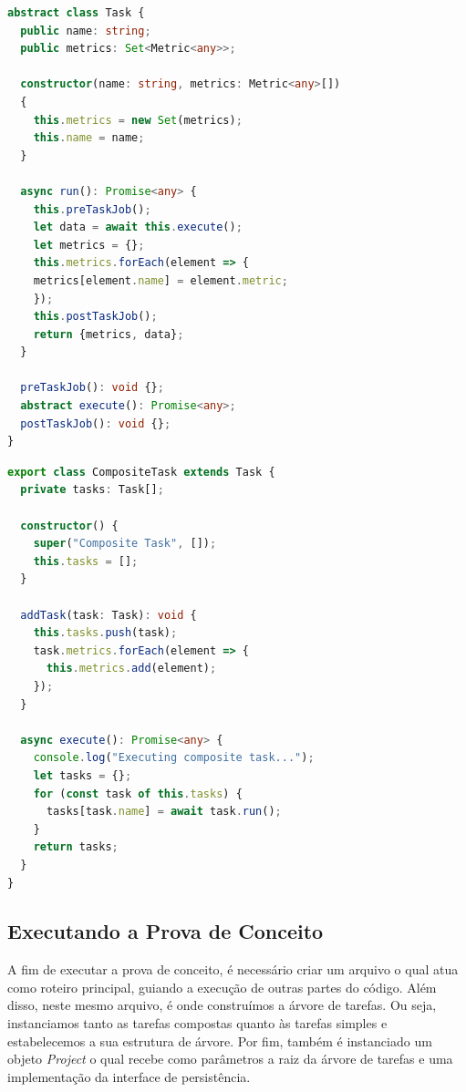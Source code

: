 \documentclass[12pt]{tcc}
\begin{document}
\begin{lstlisting}[label={lst:abstract_task}, caption={Classe abstrata responsável por definir o que todos os membros da árvore de tarefas precisam implementar.}, language=TypeScript]
abstract class Task {
  public name: string;
  public metrics: Set<Metric<any>>;

  constructor(name: string, metrics: Metric<any>[])
  {
    this.metrics = new Set(metrics);
    this.name = name;
  }

  async run(): Promise<any> {
    this.preTaskJob();
    let data = await this.execute();
    let metrics = {};
    this.metrics.forEach(element => {
    metrics[element.name] = element.metric;
    });
    this.postTaskJob();
    return {metrics, data};
  }

  preTaskJob(): void {};
  abstract execute(): Promise<any>;
  postTaskJob(): void {};
}
\end{lstlisting}

\begin{lstlisting}[label={lst:composite_task}, caption={Tarefa composta, define o comportamento de todos os nós não folha da árvore de tarefas.}, language=TypeScript]
export class CompositeTask extends Task {
  private tasks: Task[];

  constructor() {
    super("Composite Task", []);
    this.tasks = [];
  }

  addTask(task: Task): void {
    this.tasks.push(task);
    task.metrics.forEach(element => {
      this.metrics.add(element);
    });
  }

  async execute(): Promise<any> {
    console.log("Executing composite task...");
    let tasks = {};
    for (const task of this.tasks) {
      tasks[task.name] = await task.run();
    }
    return tasks;
  }
}
\end{lstlisting}


\subsection{Executando a Prova de Conceito}
\label{sec:exe_poc}
A fim de executar a prova de conceito, é necessário criar um arquivo o qual atua como roteiro principal, guiando a execução de outras partes do código.
Além disso, neste mesmo arquivo, é onde construímos a árvore de tarefas.
Ou seja, instanciamos tanto as tarefas compostas quanto às tarefas simples e estabelecemos a sua estrutura de árvore.
Por fim, também é instanciado um objeto \emph{Project} o qual recebe como parâmetros a raiz da árvore de tarefas e uma implementação da interface de persistência.
\end{document}

